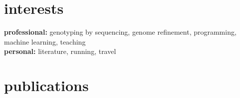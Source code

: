 \documentclass[]{friggeri-cv} %
\begin{document}

\section{interests}

\textbf{professional:} genotyping by sequencing, genome refinement, programming, machine learning, teaching \\ \textbf{personal:} literature, running, travel


\section{publications}

\cite{Bayer2014}
\cite{Bayer2014b}
\cite{Lai2014}
\cite{Chalhoub2014}
\cite{Mason2014}
\cite{Dattolo2013}





\end{document}
